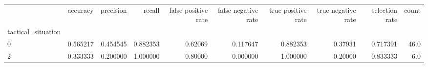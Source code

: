 \begin{tabular}{lrrrrrrrrr}
\toprule
{} &  accuracy &  precision &    recall &  false positive rate &  false negative rate &  true positive rate &  true negative rate &  selection rate &  count \\
tactical\_situation &           &            &           &                      &                      &                     &                     &                 &        \\
\midrule
0                  &  0.565217 &   0.454545 &  0.882353 &              0.62069 &             0.117647 &            0.882353 &             0.37931 &        0.717391 &   46.0 \\
2                  &  0.333333 &   0.200000 &  1.000000 &              0.80000 &             0.000000 &            1.000000 &             0.20000 &        0.833333 &    6.0 \\
\bottomrule
\end{tabular}
